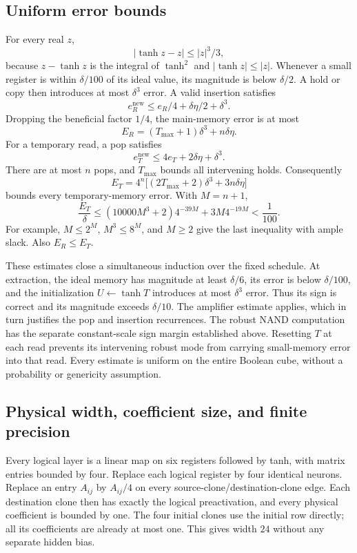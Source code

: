 \documentclass[11pt]{article}
\theoremstyle{remark}
\begin{document}
\subsection{Uniform error bounds}

For every real $z$,
\[
 |\tanh z-z|\le |z|^3/3,
\]
because $z-\tanh z$ is the integral of $\tanh^2$ and
$|\tanh z|\le|z|$. Whenever a small register is within $\delta/100$
of its ideal value, its magnitude is below $\delta/2$.
A hold or copy then introduces at most $\delta^3$ error.
A valid insertion satisfies
\[
 e_R^{\mathrm{new}}\le e_R/4+\delta\eta/2+\delta^3.
\]
Dropping the beneficial factor $1/4$, the main-memory error is at most
\[
 E_R=(T_{\max}+1)\delta^3+n\delta\eta.
\]
For a temporary read, a pop satisfies
\[
 e_T^{\mathrm{new}}\le4e_T+2\delta\eta+\delta^3.
\]
There are at most $n$ pops, and $T_{\max}$ bounds all intervening holds.
Consequently
\[
 E_T=4^n\bigl[(2T_{\max}+2)\delta^3+3n\delta\eta\bigr]
\]
bounds every temporary-memory error. With $M=n+1$,
\[
 \frac{E_T}{\delta}
 \le(10000M^3+2)4^{-39M}+3M4^{-19M}<\frac1{100}.
\]
For example, $M\le2^M$, $M^3\le8^M$, and $M\ge2$ give the last
inequality with ample slack. Also $E_R\le E_T$.

These estimates close a simultaneous induction over the fixed schedule.
At extraction, the ideal memory has magnitude at least $\delta/6$,
its error is below $\delta/100$, and the initialization
$U\leftarrow\tanh T$ introduces at most $\delta^3$ error.
Thus its sign is correct and its magnitude exceeds $\delta/10$.
The amplifier estimate applies, which in turn justifies the pop and
insertion recurrences. The robust NAND computation has the separate
constant-scale sign margin established above. Resetting $T$ at each
read prevents its intervening robust mode from carrying small-memory
error into that read. Every estimate is uniform on the entire Boolean
cube, without a probability or genericity assumption.

\subsection{Physical width, coefficient size, and finite precision}

Every logical layer is a linear map on six registers followed by tanh,
with matrix entries bounded by four. Replace each logical register by
four identical neurons. Replace an entry $A_{ij}$ by $A_{ij}/4$ on
every source-clone/destination-clone edge. Each destination clone then
has exactly the logical preactivation, and every physical coefficient
is bounded by one. The four initial clones use the initial row directly;
all its coefficients are already at most one. This gives width $24$
without any separate hidden bias.
\end{document}
